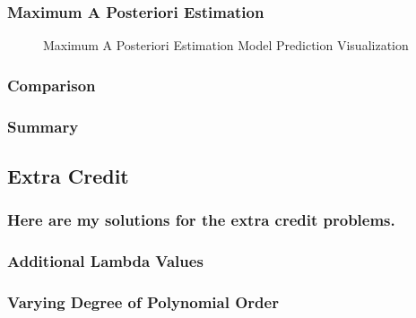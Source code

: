 \documentclass[12pt,twoside,a4paper]{article}
\begin{document}
\pagebreak
\subsubsection*{Maximum A Posteriori Estimation}

\begin{figure}[!htb]
    \centering
    \hspace{0mm}
    \hspace{0mm}
    \caption{Maximum A Posteriori Estimation Model Prediction Visualization}
\end{figure}

\subsubsection{Comparison}

\subsubsection{Summary}

\pagebreak
\subsection{Extra Credit}
\subsubsection*{Here are my solutions for the extra credit problems.}

\subsubsection{Additional Lambda Values}

\subsubsection{Varying Degree of Polynomial Order}
\end{document}
